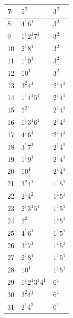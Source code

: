 {\begin{center}
\begin{tabular}{||l|l|l||}
     7   & $5^{2}$                & $3^{2}$             \\ \hline 
     8   & $4^{1}6^{1}$           & $3^{2}$             \\ \hline 
     9   & $1^{1}2^{1}7^{1}$      & $3^{2}$             \\ \hline 
     10  & $2^{1}8^{1}$           & $3^{2}$             \\ \hline 
     11  & $1^{1}9^{1}$           & $3^{2}$              \\ \hline 
     12  & $10^{1}$              & $3^{2}$             \\ \hline 
     13  & $3^{2}4^{1}$          & $2^{1}4^{1}$        \\ \hline 
     14  & $1^{1}4^{1}5^{1}$     & $2^{1}4^{1}$        \\ \hline 
     15  & $5^{2}$               & $2^{1}4^{1}$        \\ \hline 
     16  & $1^{1}3^{1}6^{1}$     & $2^{1}4^{1}$        \\ \hline 
     17  & $4^{1}6^{1}$          & $2^{1}4^{1}$        \\ \hline 
     18  & $3^{1}7^{1}$          & $2^{1}4^{1}$        \\ \hline 
     19  & $1^{1}9^{1}$          & $2^{1}4^{1}$        \\ \hline 
     20  & $10^{1}$              & $2^{1}4^{1}$        \\ \hline 
     21  &$ 3^{2}4^{1} $         & $1^{1}5^{1}$        \\ \hline 
     22  & $2^{1}4^{2} $         & $1^{1}5^{1}$        \\ \hline 
     23  & $2^{1}3^{1}5^{1}$     & $1^{1}5^{1}$        \\ \hline  
     24  &$ 5^{2}$               & $1^{1}5^{1}$        \\ \hline 
     25  & $4^{1}6^{1} $         & $1^{1}5^{1}$         \\ \hline 
     26  & $3^{1}7^{1}$          & $1^{1}5^{1}$         \\ \hline 
     27  & $2^{1}8^{1}$          & $1^{1}5^{1}$         \\ \hline 
     28  & $10^{1}$              & $1^{1}5^{1}$        \\ \hline 
     29  & $1^{1}2^{1}3^{1}4^{1}$& $6^{1}$             \\ \hline 
     30  &$ 3^{2}4^{1}$          & $6^{1}$         \\ \hline 
     31  & $2^{1}4^{2}$          & $6^{1}$         \\ \hline 

\end{tabular}
\end{center}}
